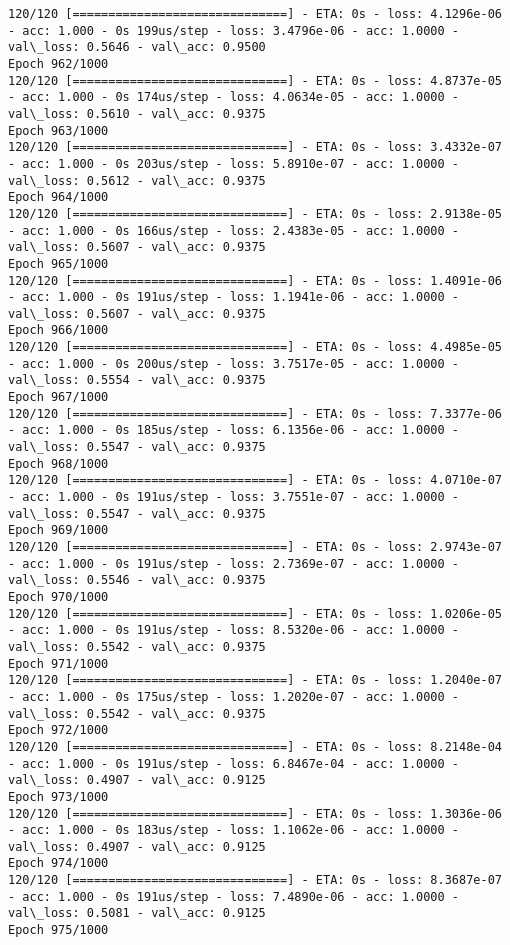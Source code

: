 \documentclass[11pt]{article}
\begin{document}
\begin{Verbatim}[commandchars=\\\{\}]
120/120 [==============================] - ETA: 0s - loss: 4.1296e-06 - acc: 1.000 - 0s 199us/step - loss: 3.4796e-06 - acc: 1.0000 - val\_loss: 0.5646 - val\_acc: 0.9500
Epoch 962/1000
120/120 [==============================] - ETA: 0s - loss: 4.8737e-05 - acc: 1.000 - 0s 174us/step - loss: 4.0634e-05 - acc: 1.0000 - val\_loss: 0.5610 - val\_acc: 0.9375
Epoch 963/1000
120/120 [==============================] - ETA: 0s - loss: 3.4332e-07 - acc: 1.000 - 0s 203us/step - loss: 5.8910e-07 - acc: 1.0000 - val\_loss: 0.5612 - val\_acc: 0.9375
Epoch 964/1000
120/120 [==============================] - ETA: 0s - loss: 2.9138e-05 - acc: 1.000 - 0s 166us/step - loss: 2.4383e-05 - acc: 1.0000 - val\_loss: 0.5607 - val\_acc: 0.9375
Epoch 965/1000
120/120 [==============================] - ETA: 0s - loss: 1.4091e-06 - acc: 1.000 - 0s 191us/step - loss: 1.1941e-06 - acc: 1.0000 - val\_loss: 0.5607 - val\_acc: 0.9375
Epoch 966/1000
120/120 [==============================] - ETA: 0s - loss: 4.4985e-05 - acc: 1.000 - 0s 200us/step - loss: 3.7517e-05 - acc: 1.0000 - val\_loss: 0.5554 - val\_acc: 0.9375
Epoch 967/1000
120/120 [==============================] - ETA: 0s - loss: 7.3377e-06 - acc: 1.000 - 0s 185us/step - loss: 6.1356e-06 - acc: 1.0000 - val\_loss: 0.5547 - val\_acc: 0.9375
Epoch 968/1000
120/120 [==============================] - ETA: 0s - loss: 4.0710e-07 - acc: 1.000 - 0s 191us/step - loss: 3.7551e-07 - acc: 1.0000 - val\_loss: 0.5547 - val\_acc: 0.9375
Epoch 969/1000
120/120 [==============================] - ETA: 0s - loss: 2.9743e-07 - acc: 1.000 - 0s 191us/step - loss: 2.7369e-07 - acc: 1.0000 - val\_loss: 0.5546 - val\_acc: 0.9375
Epoch 970/1000
120/120 [==============================] - ETA: 0s - loss: 1.0206e-05 - acc: 1.000 - 0s 191us/step - loss: 8.5320e-06 - acc: 1.0000 - val\_loss: 0.5542 - val\_acc: 0.9375
Epoch 971/1000
120/120 [==============================] - ETA: 0s - loss: 1.2040e-07 - acc: 1.000 - 0s 175us/step - loss: 1.2020e-07 - acc: 1.0000 - val\_loss: 0.5542 - val\_acc: 0.9375
Epoch 972/1000
120/120 [==============================] - ETA: 0s - loss: 8.2148e-04 - acc: 1.000 - 0s 191us/step - loss: 6.8467e-04 - acc: 1.0000 - val\_loss: 0.4907 - val\_acc: 0.9125
Epoch 973/1000
120/120 [==============================] - ETA: 0s - loss: 1.3036e-06 - acc: 1.000 - 0s 183us/step - loss: 1.1062e-06 - acc: 1.0000 - val\_loss: 0.4907 - val\_acc: 0.9125
Epoch 974/1000
120/120 [==============================] - ETA: 0s - loss: 8.3687e-07 - acc: 1.000 - 0s 191us/step - loss: 7.4890e-06 - acc: 1.0000 - val\_loss: 0.5081 - val\_acc: 0.9125
Epoch 975/1000

\end{Verbatim}
\end{document}
